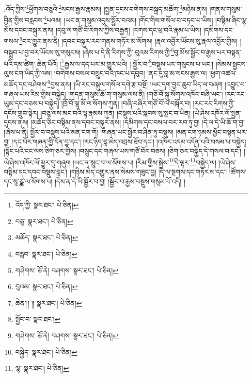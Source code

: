 :འོད་ཀྱིས་\footnote{འོད་ཀྱི་  སྣར་ཐང་།  པེ་ཅིན། }ཕྱོགས་བཅུའི་\footnote{བཅུ་  སྣར་ཐང་།  པེ་ཅིན། }སངས་རྒྱས་རྣམས། །སྤྱན་དྲངས་བགེགས་བསྐྲད་མཆོག་\footnote{མཆོད་  སྣར་ཐང་།  པེ་ཅིན། }མཉེས་ནས། །གནས་གསུམ་བྱིན་གྱིས་བརླབས་\footnote{བརླབ་  སྣར་ཐང་།  པེ་ཅིན། }པའམ། །ཡང་ན་གསུམ་འདུས་སྦྱོར་བའམ། །གོང་གིས་གསོལ་བ་བཏབ་པ་ཡིས། །བསྟིམ་ཞིང་ལྷ་མོས་དབང་བསྐུར་ནས། །དབུ་ལ་གཙོ་བོ་རིགས་ཀྱིས་བརྒྱན། །རགས་དང་ཕྲ་བའི་རྣམ་པ་ཡིས། །དམིགས་དང་གསལ་\footnote{གཤེགས་  ཅོ་ནེ། བཤགས་  སྣར་ཐང་།  པེ་ཅིན། }བར་གྱུར་ནས་ནི། །དབང་བསྐུར་རབ་གནས་གཏོར་མ་སོགས། །རྣལ་འབྱོར་ཡོངས་སུ་རྣལ་འབྱོར་གྱིས། །བསྒྲུབ་པ་བྱ་བར་ཡོངས་སུ་གསུངས། །ཞེས་པ་དེ་ནི་རིགས་ཀྱི་:བུའམ་རིགས་ཀྱི་\footnote{བུའམ་  སྣར་ཐང་།  པེ་ཅིན། }བུ་མོས་སྦྱོར་བ་རྒྱས་པར་བསྟན་པའི་དམ་ཚིག་:ཆེན་པོའོ། །\footnote{ཆེན་།། །།  སྣར་ཐང་།  པེ་ཅིན། }རྒྱས་ལ་དད་པར་མ་གྱུར་པའི། །:སྦྱོར་བ་\footnote{སྦྱོང་བ་  སྣར་ཐང་། }བསྡུས་པར་གསུངས་པ་ཡང་། །སེམས་སྦྱངས་ལུས་ངག་ཡིད་ཀྱི་ལས། །བགེགས་བསལ་བསྲུང་བའི་ཁང་པ་དབུབ། །ནང་དུ་བླ་མ་སངས་རྒྱས་ལ། །ཕྱག་འཚལ་མཆོད་དང་བཤེགས་\footnote{གཤེགས་  ཅོ་ནེ། བཤགས་  སྣར་ཐང་།  པེ་ཅིན། }བྱས་ནས། །ཡི་རང་བསྐུལ་གསོལ་དགེ་རྩ་བསྔོ། །ཡང་དག་བྱང་ཆུབ་ཡིད་ལ་བཞག །འབྱུང་བ་གཞལ་ཡས་རིམ་གྱིས་བསྐྱེད། །གདན་གསུམ་ཆོ་ག་གསུམ་ལས་ནི། །གཅོ་བོ་སྐུ་སོགས་འཁོར་བཞི་ཡང་། །རང་རང་ཡུམ་དང་བཅས་པ་བསྐྱེད། །ཁྲོ་བོ་ལྷ་མོ་ལ་སོགས་ཀུན། །བཞི་བཞིར་གཙོ་བོ་ལ་བསྐོར་བ། །རང་རང་རིགས་ཀྱི་དངོས་གྲུབ་སྟེར། །བཅུ་ལས་མང་བའི་ལྷ་རྣམས་ཀུན། །བསྡུས་པའི་སྐབས་སུ་སྤང་བ་ཡིན། །ཡེ་ཤེས་འཁོར་ལོ་སྤྱན་དྲངས་ནས། །མཆོད་ཅིང་བསྟིམ་ནས་དབང་བསྐུར་ནས། །དམིགས་དང་བསལ་བར་རབ་ཏུ་བྱ། །དེ་ལ་དེ་ཡི་ཆོ་ག་བྱ། །ཞེས་པ་ནི། སྦྱོར་བ་བསྡུས་པའི་མན་ངག་གོ། །གཞན་ཡང་སྦྱོར་བ་ཤིན་ཏུ་བསྡུས། །མན་ངག་ཉམས་མྱོང་བསྟན་པར་བྱ། །དང་པོར་གཞན་གྱི་དོན་བྱ་དང་། །རང་ཉིད་བླ་མེད་འབྲས་ཐོབ་དང་། །འཁོར་འདམ་འདོན་པའི་བསམ་པ་བསྐྱེད། །སྟོང་པའི་ངང་ལས་ཅིག་ཅར་གྱིས། །བསྲུང་དང་གཞལ་ཡས་གཙོ་བོར་བཅས། །ཅིག་ཅར་བསྐྱེད་དེ་གསལ་བ་དང་། །ཡེ་ཤེས་འཁོར་ལོ་མྱུར་དུ་གཞུག །ཡང་ན་སྲུང་བ་ལ་སོགས་པ། །རིམ་གྱིས་སྐྱེས་\footnote{བསྐྱེད་  སྣར་ཐང་།  པེ་ཅིན། }དེ་ལྷར་\footnote{ལྷ་  སྣར་ཐང་།  པེ་ཅིན། }བསྐྱེད་ལ། །ཡེ་ཤེས་བསྟིམ་དང་དབང་བསྡུས་བླང་། །གཉིས་མེད་འགྱུར་ནས་སེམས་གཟུང་བྱ། །དེ་ལ་སྔགས་དང་གཏོར་མ་དང་། །ཚོགས་དང་སཱ་ཙྪ་ལ་སོགས་པ། །དེས་ན་དེ་ཡི་སྦྱོར་བ་བྱ། །སྦྱོར་བ་རྒྱས་བསྡུས་གསུམ་པོ་འདི། །
